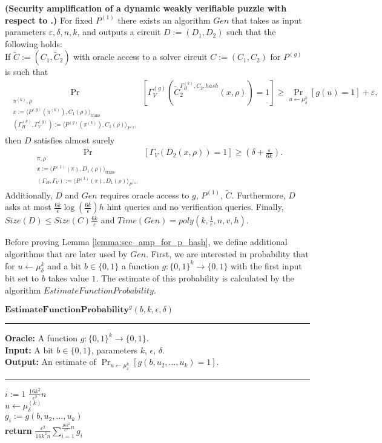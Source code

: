 \begin{lemma}\textbf{(Security amplification of a dynamic weakly verifiable puzzle with respect to .)}
  \label{lemma:sec_amp_for_p_hash}
  For fixed $P^{(1)}$ there exists an algorithm $Gen$ that takes as input parameters $\varepsilon, \delta, n, k$,
  and outputs a circuit $D := (D_1, D_2)$ such that the following holds: \\
  If $\widetilde{C} := (C_1, \widetilde{C}_2)$ with oracle access to a solver circuit $C := (C_1, C_2)$ for $P^{(g)}$ is such that
  \begin{align*}
    \underset{\substack{\pi^{(k)}, \rho \\ x:= \langle P^{(g)}(\pi^{(k)}), {C}_1(\rho) \rangle_{\text{trans}} \\
        (\Gamma_H^{(k)}, \Gamma_V^{(g)}) := \langle P^{(g)}(\pi^{(k)}), C_1(\rho) \rangle_{P^{(g)}}}}{\Pr}[\Gamma_V^{(g)}(\widetilde{C}_2^{\Gamma_H^{(k)}, C_2, hash}(x,\rho)) = 1]
    \geq \underset{u \leftarrow \mu_\delta^k}{\Pr}[g(u) = 1] + \varepsilon,
  \end{align*}
  then $D$ satisfies almost surely
  \begin{align*}
    \underset{\substack{\pi, \rho \\ x := \langle P^{(1)}(\pi), D_1(\rho) \rangle_{\text{trans}} \\
        (\Gamma_H, \Gamma_V) := \langle P^{(1)}(\pi), D_1(\rho) \rangle_{P^{(1)}}}}
    {\Pr}[\Gamma_V(D_2(x, \rho)) = 1] \geq (\delta + \frac{\varepsilon}{6k}).
  \end{align*}
  Additionally, $D$ and $Gen$ requires oracle access to $g$, $P^{(1)}$, $\widetilde{C}$.
  Furthermore, $D$ asks at most $\frac{6k}{\epsilon}\log\left(\frac{6k}{\epsilon}\right) h$ hint queries and no verification queries.
  Finally, $Size(D) \leq Size(C)\frac{6k}{\varepsilon}$ and $Time(Gen) = poly(k, \frac{1}{\varepsilon}, n, v, h)$.
\end{lemma}
%
%
Before proving Lemma \ref{lemma:sec_amp_for_p_hash}, we define additional algorithms that are later used by $Gen$.
First, we are interested in probability that for $u \leftarrow \mu_{\delta}^k$ and a bit $b \in \{0,1\}$ a function $g: \{0,1\}^{k} \rightarrow \{0,1\}$
with the first input bit set to $b$ takes value $1$. The estimate of this probability is calculated by the algorithm
$EstimateFunctionProbability$.
%
\begin{codeblock}
  $\textbf{EstimateFunctionProbability}^{g}(b, k, \epsilon, \delta)$
  \medskip
  \hrule
  \medskip
  \textbf{Oracle:} A function $g : \{0,1\}^{k} \rightarrow \{0,1\}$.\\
  \textbf{Input:} A bit $b \in \{0,1\}$, parameters $k$, $\epsilon$, $\delta$. \\
  \textbf{Output:} An estimate of $\Pr_{u \leftarrow \mu_{\delta}^{k}}[g(b,u_2, \dots, u_k) = 1]$.
  \medskip\hrule\medskip
  \For $i:=1$ \To $\frac{16k^2}{\epsilon^2} n$ \Do \\
  \IndI $u \leftarrow \mu_{\delta}^{(k)}$ \\
  \IndI $g_i := g(b, u_2, \dots, u_k)$ \\
  \textbf{return} $\frac{\epsilon^2}{16k^2n} \sum_{i=1}^{\frac{16k^2}{\epsilon^2} n} g_i$
\end{codeblock}
